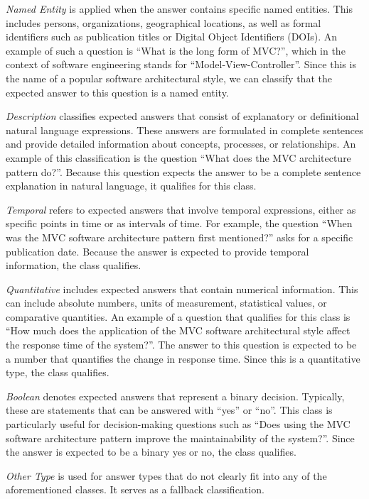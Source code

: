 \emph{Named Entity} is applied when the answer contains specific named entities. This includes persons, organizations, geographical locations, as well as formal identifiers such as publication titles or Digital Object Identifiers (DOIs). An example of such a question is \enquote{What is the long form of MVC?}, which in the context of software engineering stands for \enquote{Model-View-Controller}. Since this is the name of a popular software architectural style, we can classify that the expected answer to this question is a named entity.

\emph{Description} classifies expected answers that consist of explanatory or definitional natural language expressions. These answers are formulated in complete sentences and provide detailed information about concepts, processes, or relationships. An example of this classification is the question \enquote{What does the MVC architecture pattern do?}. Because this question expects the answer to be a complete sentence explanation in natural language, it qualifies for this class.

\emph{Temporal} refers to expected answers that involve temporal expressions, either as specific points in time or as intervals of time. For example, the question \enquote{When was the MVC software architecture pattern first mentioned?} asks for a specific publication date. Because the answer is expected to provide temporal information, the class qualifies.

\emph{Quantitative} includes expected answers that contain numerical information. This can include absolute numbers, units of measurement, statistical values, or comparative quantities. An example of a question that qualifies for this class is \enquote{How much does the application of the MVC software architectural style affect the response time of the system?}. The answer to this question is expected to be a number that quantifies the change in response time. Since this is a quantitative type, the class qualifies.

\emph{Boolean} denotes expected answers that represent a binary decision. Typically, these are statements that can be answered with \enquote{yes} or \enquote{no}. This class is particularly useful for decision-making questions such as \enquote{Does using the MVC software architecture pattern improve the maintainability of the system?}. Since the answer is expected to be a binary yes or no, the class qualifies.

\emph{Other Type} is used for answer types that do not clearly fit into any of the aforementioned classes. It serves as a fallback classification.


